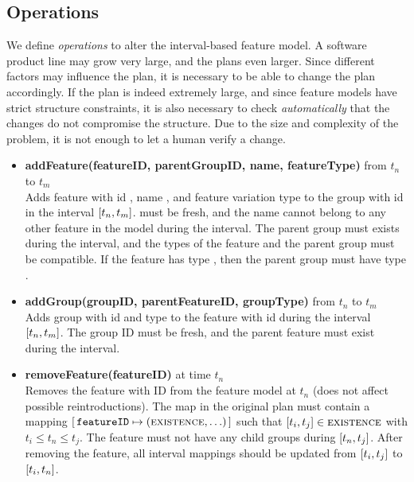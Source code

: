\subsection{Operations}
\label{sub:operations}

We define \emph{operations} to alter the interval-based feature model. A software product line may grow very large, and the plans even larger. Since different factors may influence the plan, it is necessary to be able to change the plan accordingly. If the plan is indeed extremely large, and since feature models have strict structure constraints, it is also necessary to check \emph{automatically} that the changes do not compromise the structure. Due to the size and complexity of the problem, it is not enough to let a human verify a change. 

\begin{itemize}
  \item \textbf{addFeature(featureID, parentGroupID, name, featureType)} from $t_n$ to $t_m$\\
    Adds feature with id , name , and feature variation type  to the group with id  in the interval $\interval{t_n}{t_m}$.  must be fresh, and the name cannot belong to any other feature in the model during the interval. The parent group must exists during the interval, and the types of the feature and the parent group must be compatible. If the feature has type \mandatory{}, then the parent group must have type \andtype{}.
  \item \textbf{addGroup(groupID, parentFeatureID, groupType)} from $t_n$ to $t_m$\\
    Adds group with id  and type  to the feature with id  during the interval $\interval{t_n}{t_m}$. The group ID must be fresh, and the parent feature must exist during the interval. 
  \item \textbf{removeFeature(featureID)} at time $t_n$\\
    Removes the feature with ID  from the feature model at $t_n$ (does not affect possible reintroductions). The \features{} map in the original plan must contain a mapping $[ \,\texttt{featureID} \mapsto (\textsc{existence}, \ldots)\, ]$ such that $\interval{t_i}{t_j} \in \map{existence}$ with $ t_i \leq t_n \leq t_j$. The feature must not have any child groups during $\interval{t_n}{t_j}$. After removing the feature, all interval mappings should be updated from $\interval{t_i}{t_j}$ to $\interval{t_i}{t_n}$.

\end{itemize}
